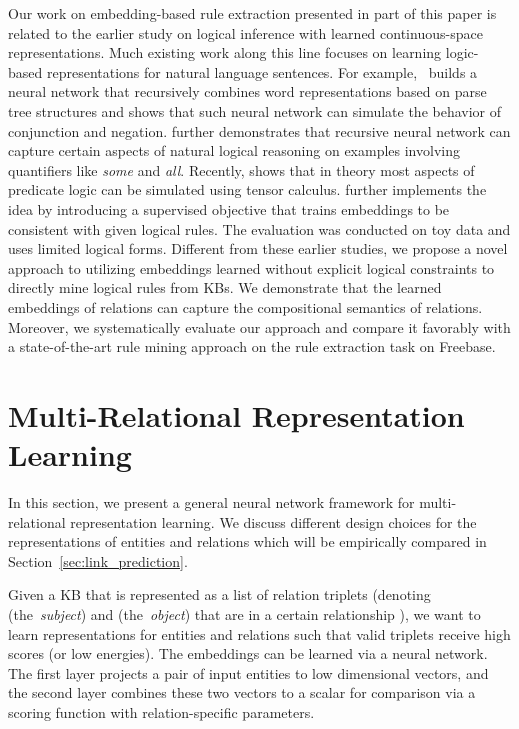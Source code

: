 \documentclass{article} \usepackage{iclr2015,times}
\begin{document}
Our work on embedding-based rule extraction presented in part of this paper is related to the earlier study on logical inference with learned continuous-space representations. Much existing work along this line focuses on learning logic-based representations for natural language sentences. For example,~\citet{socher:semantic} builds a neural network that recursively combines word representations based on parse tree structures and shows that such neural network can simulate the behavior of conjunction and negation. \citet{Bowman2014} further demonstrates that recursive neural network can capture certain aspects of natural logical reasoning on examples involving quantifiers like \textit{some} and \textit{all}. Recently, \citet{Grefenstette2013} shows that in theory most aspects of predicate logic can be simulated using tensor calculus. \citet{Tim2014} further implements the idea by introducing a supervised objective that trains embeddings to be consistent with given logical rules. The evaluation was conducted on toy data and uses limited logical forms. Different from these earlier studies, we propose a novel approach to utilizing embeddings learned without explicit logical constraints to directly mine logical rules from KBs. We demonstrate that the learned embeddings of relations can capture the compositional semantics of relations. Moreover, we systematically evaluate our approach and compare it favorably with a state-of-the-art rule mining approach on the rule extraction task on Freebase.

\section{Multi-Relational Representation Learning}
\label{sec:framework}
In this section, we present a general neural network framework for multi-relational representation learning. We discuss different design choices for the representations of entities and relations which will be empirically compared in Section~\ref{sec:link_prediction}.

Given a KB that is represented as a list of relation triplets  (denoting  (the~\textit{subject}) and  (the~\textit{object}) that are in a certain relationship ), we want to learn representations for entities and relations such that valid triplets receive high scores (or low energies). The embeddings can be learned via a neural network. The first layer projects a pair of input entities to low dimensional vectors, and the second layer combines these two vectors to a scalar for comparison via a scoring function with relation-specific parameters. 
\end{document}
